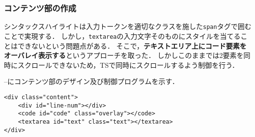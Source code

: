 \documentclass[autodetect-engine,dvi=dvipdfmx,ja=standard,
               a4j,11pt]{bxjsarticle}
\newcommand{\figref}[1]{\makebox{図~\ref{#1}}}
\begin{document}
\subsubsection{コンテンツ部の作成}

シンタックスハイライトは入力トークンを適切なクラスを施した\verb|span|タグで囲むことで実現する．
しかし，\verb|textarea|の入力文字そのものにスタイルを当てることはできないという問題点がある．
そこで，{\bf テキストエリア上にコード要素をオーバレイ表示する}というアプローチを取った．
しかしこのままでは2要素を同時にスクロールできないため，TSで同時にスクロールするよう制御を行う．

\figref{prog:overlay-html}--\figref{prog:overlay-ts}にコンテンツ部のデザイン及び制御プログラムを示す．

\begin{lstlisting}[caption={{\tt index.html(コンテンツ部抜粋)}(オーバレイ)}, label={prog:overlay-html}]
<div class="content">
    <div id="line-num"></div>
    <code id="code" class="overlay"></code>
    <textarea id="text" class="text"></textarea>
</div>
\end{lstlisting}
\end{document}

